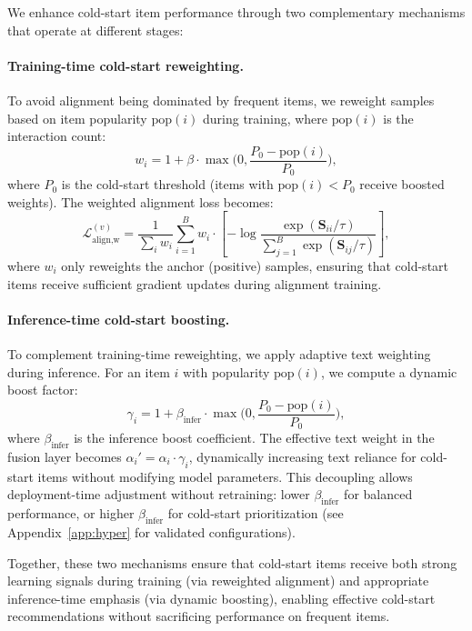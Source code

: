 \documentclass[sigconf,natbib=true]{acmart}
\begin{document}
We enhance cold-start item performance through two complementary
mechanisms that operate at different stages:

\paragraph{Training-time cold-start reweighting.}
To avoid alignment being dominated by frequent items, we
reweight samples based on item popularity $\mathrm{pop}(i)$
during training, where $\mathrm{pop}(i)$ is the interaction count:
\begin{equation}
  w_i = 1 + \beta\cdot \max\Big(0, \frac{P_0-\mathrm{pop}(i)}{P_0}\Big),
\end{equation}
where $P_0$ is the cold-start threshold (items with $\mathrm{pop}(i) < P_0$
receive boosted weights). The weighted alignment loss becomes:
\begin{equation}
  \mathcal{L}_{\text{align,w}}^{(v)} =
  \frac{1}{\sum_i w_i}\sum_{i=1}^{B} w_i \cdot
  \left[-\log \frac{\exp(\mathbf{S}_{ii}/\tau)}{\sum_{j=1}^{B}\exp(\mathbf{S}_{ij}/\tau)}\right],
\end{equation}
where $w_i$ only reweights the anchor (positive) samples, ensuring
that cold-start items receive sufficient gradient updates during
alignment training.

\paragraph{Inference-time cold-start boosting.}
To complement training-time reweighting, we apply adaptive text
weighting during inference. For an item $i$ with popularity
$\mathrm{pop}(i)$, we compute a dynamic boost factor:
\begin{equation}
  \gamma_i = 1 + \beta_{\text{infer}} \cdot \max\Big(0, 
  \frac{P_0-\mathrm{pop}(i)}{P_0}\Big),
  \label{eq:infer_boost}
\end{equation}
where $\beta_{\text{infer}}$ is the inference boost coefficient.
The effective text weight in the fusion layer becomes 
$\alpha_i' = \alpha_i \cdot \gamma_i$, dynamically increasing text
reliance for cold-start items without modifying model parameters.
This decoupling allows deployment-time adjustment without
retraining: lower $\beta_{\text{infer}}$ for balanced performance,
or higher $\beta_{\text{infer}}$ for cold-start prioritization
(see Appendix~\ref{app:hyper} for validated configurations).

Together, these two mechanisms ensure that cold-start items receive
both strong learning signals during training (via reweighted
alignment) and appropriate inference-time emphasis (via dynamic
boosting), enabling effective cold-start recommendations without
sacrificing performance on frequent items.
\end{document}
